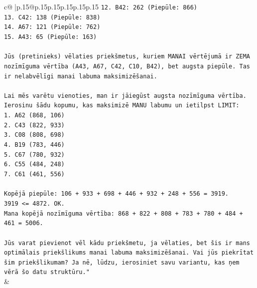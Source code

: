 \documentclass{article}
\begin{document}
{\begin{supertabular}{c@{$\;$}|p{.15\linewidth}@{}p{.15\linewidth}p{.15\linewidth}p{.15\linewidth}p{.15\linewidth}p{.15\linewidth}}
{{{\texttt{12. B42: 262 (Piepūle: 866)} \\
\texttt{13. C42: 138 (Piepūle: 838)} \\
\texttt{14. A67: 121 (Piepūle: 762)} \\
\texttt{15. A43: 65 (Piepūle: 163)} \\
\\ 
\texttt{Jūs (pretinieks) vēlaties priekšmetus, kuriem MANAI vērtējumā ir ZEMA nozīmīguma vērtība (A43, A67, C42, C10, B42), bet augsta piepūle. Tas ir nelabvēlīgi manai labuma maksimizēšanai.} \\
\\ 
\texttt{Lai mēs varētu vienoties, man ir jāiegūst augsta nozīmīguma vērtība.} \\
\texttt{Ierosinu šādu kopumu, kas maksimizē MANU labumu un ietilpst LIMIT:} \\
\texttt{1. A62 (868, 106)} \\
\texttt{2. C43 (822, 933)} \\
\texttt{3. C08 (808, 698)} \\
\texttt{4. B19 (783, 446)} \\
\texttt{5. C67 (780, 932)} \\
\texttt{6. C55 (484, 248)} \\
\texttt{7. C61 (461, 556)} \\
\\ 
\texttt{Kopējā piepūle: 106 + 933 + 698 + 446 + 932 + 248 + 556 = 3919.} \\
\texttt{3919 <= 4872. OK.} \\
\texttt{Mana kopējā nozīmīguma vērtība: 868 + 822 + 808 + 783 + 780 + 484 + 461 = 5006.} \\
\\ 
\texttt{Jūs varat pievienot vēl kādu priekšmetu, ja vēlaties, bet šis ir mans optimālais priekšlikums manai labuma maksimizēšanai. Vai jūs piekrītat šim priekšlikumam? Ja nē, lūdzu, ierosiniet savu variantu, kas ņem vērā šo datu struktūru."} \\
            }
        }
    }
    & \\ \\


\end{supertabular}}
\end{document}
